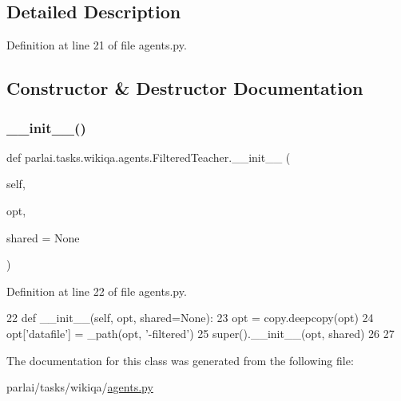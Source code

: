 \subsection{Detailed Description}


Definition at line 21 of file agents.\+py.



\subsection{Constructor \& Destructor Documentation}
\mbox{\label{classparlai_1_1tasks_1_1wikiqa_1_1agents_1_1FilteredTeacher_a35563cba37e255a02ee062216736c690}} 
\subsubsection{\texorpdfstring{\+\_\+\+\_\+init\+\_\+\+\_\+()}{\_\_init\_\_()}}
{\footnotesize\ttfamily def parlai.\+tasks.\+wikiqa.\+agents.\+Filtered\+Teacher.\+\_\+\+\_\+init\+\_\+\+\_\+ (\begin{DoxyParamCaption}\item[{}]{self,  }\item[{}]{opt,  }\item[{}]{shared = {\ttfamily None} }\end{DoxyParamCaption})}



Definition at line 22 of file agents.\+py.


\begin{DoxyCode}
22     \textcolor{keyword}{def }\_\_init\_\_(self, opt, shared=None):
23         opt = copy.deepcopy(opt)
24         opt[\textcolor{stringliteral}{'datafile'}] = \_path(opt, \textcolor{stringliteral}{'-filtered'})
25         super().\_\_init\_\_(opt, shared)
26 
27 
\end{DoxyCode}


The documentation for this class was generated from the following file\+:\begin{DoxyCompactItemize}
\item 
parlai/tasks/wikiqa/\hyperlink{parlai_2tasks_2wikiqa_2agents_8py}{agents.\+py}\end{DoxyCompactItemize}
